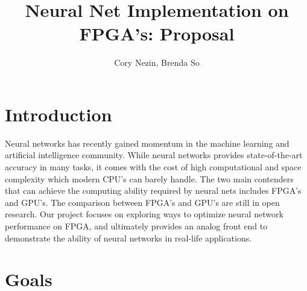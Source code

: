 \documentclass[12pt]{article}
\begin{document}
\title{Neural Net Implementation on FPGA's: Proposal}
\author{Cory Nezin, Brenda So}
\maketitle

\section*{Introduction}

Neural networks has recently gained momentum in the machine learning and artificial intelligence community. While neural networks provides state-of-the-art accuracy in many tasks, it comes with the cost of high computational and space complexity which modern CPU's can barely handle. The two main contenders that can achieve the computing ability required by neural nets includes FPGA's and GPU's. The comparison between FPGA's and GPU's are still in open research. Our project focuses on exploring ways to optimize neural network performance on FPGA, and ultimately provides an analog front end to demonstrate the ability of neural networks in real-life applications.

\section*{Goals}
\end{document}
